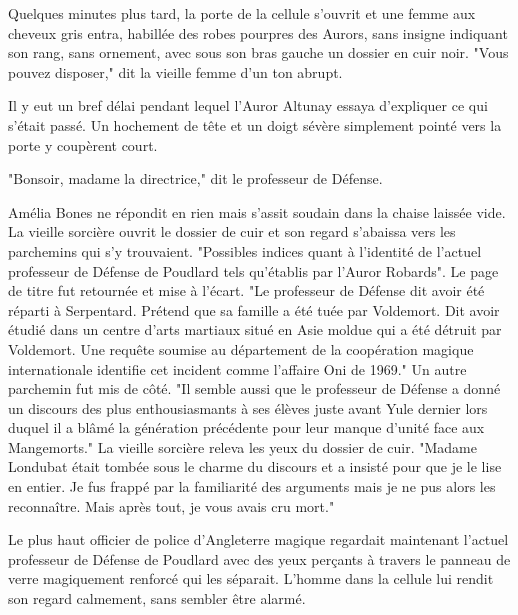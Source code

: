 Quelques minutes plus tard, la porte de la cellule s'ouvrit et une femme aux cheveux gris entra, habillée des robes pourpres des Aurors, sans insigne indiquant son rang, sans ornement, avec sous son bras gauche un dossier en cuir noir. "Vous pouvez disposer," dit la vieille femme d'un ton abrupt.

Il y eut un bref délai pendant lequel l'Auror Altunay essaya d'expliquer ce qui s'était passé. Un hochement de tête et un doigt sévère simplement pointé vers la porte y coupèrent court.

"Bonsoir, madame la directrice," dit le professeur de Défense.

Amélia Bones ne répondit en rien mais s'assit soudain dans la chaise laissée vide. La vieille sorcière ouvrit le dossier de cuir et son regard s'abaissa vers les parchemins qui s'y trouvaient. "Possibles indices quant à l'identité de l'actuel professeur de Défense de Poudlard tels qu'établis par l'Auror Robards". Le page de titre fut retournée et mise à l'écart. "Le professeur de Défense dit avoir été réparti à Serpentard. Prétend que sa famille a été tuée par Voldemort. Dit avoir étudié dans un centre d'arts martiaux situé en Asie moldue qui a été détruit par Voldemort. Une requête soumise au département de la coopération magique internationale identifie cet incident comme l'affaire Oni de 1969." Un autre parchemin fut mis de côté. "Il semble aussi que le professeur de Défense a donné un discours des plus enthousiasmants à ses élèves juste avant Yule dernier lors duquel il a blâmé la génération précédente pour leur manque d'unité face aux Mangemorts." La vieille sorcière releva les yeux du dossier de cuir. "Madame Londubat était tombée sous le charme du discours et a insisté pour que je le lise en entier. Je fus frappé par la familiarité des arguments mais je ne pus alors les reconnaître. Mais après tout, je vous avais cru mort."

Le plus haut officier de police d'Angleterre magique regardait maintenant l'actuel professeur de Défense de Poudlard avec des yeux perçants à travers le panneau de verre magiquement renforcé qui les séparait. L'homme dans la cellule lui rendit son regard calmement, sans sembler être alarmé.

